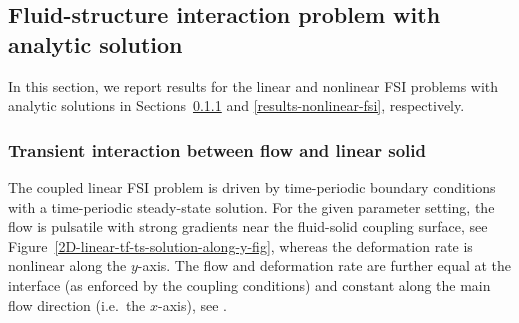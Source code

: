 \documentclass[3p]{elsarticle}
\begin{document}
\subsection{Fluid-structure interaction problem with analytic solution}
\label{results-fsi}
In this section, we report results for the linear and nonlinear FSI problems with analytic solutions
in Sections~\ref{results-linear-fsi} and \ref{results-nonlinear-fsi},
respectively.
\subsubsection{Transient interaction between flow and linear solid}
\label{results-linear-fsi}
The coupled linear FSI problem is driven by time-periodic boundary conditions
with a time-periodic steady-state solution.
For the given parameter setting, the flow is pulsatile
with strong gradients near the fluid-solid coupling surface,
see Figure~\ref{2D-linear-tf-ts-solution-along-y-fig},
whereas the deformation rate is nonlinear along the $y$-axis.
The flow and deformation rate are further equal at the interface
(as enforced by the coupling conditions)
and constant along the main flow direction (i.e.\ the $x$-axis),
see \cite{HessenthalerBalmusRoehrleNordsletten2020}.
\end{document}
